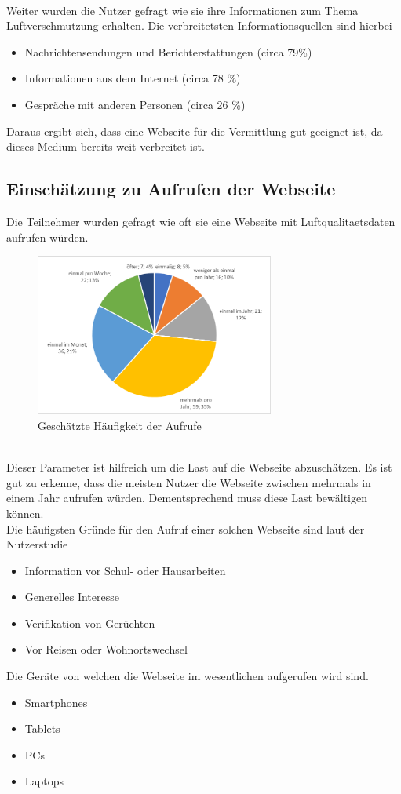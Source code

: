 \\
Weiter wurden die Nutzer gefragt wie sie ihre Informationen zum Thema \gls{Luftverschmutzung} erhalten. Die verbreitetsten Informationsquellen sind hierbei
\begin{itemize} [noitemsep]
    \item Nachrichtensendungen und Berichterstattungen (circa 79\%)
    \item Informationen aus dem Internet (circa 78 \%)
    \item Gespräche mit anderen Personen (circa 26 \%)
\end{itemize}
Daraus ergibt sich, dass eine Webseite für die Vermittlung gut geeignet ist, da dieses Medium bereits weit verbreitet ist.

\subsection{Einschätzung zu Aufrufen der Webseite}
Die Teilnehmer wurden gefragt wie oft sie eine Webseite mit \gls{Luftqualitaetsdaten} aufrufen würden.
\\
\begin{figure}[h]
    \centering
    \includegraphics[width=0.7\textwidth]{media/diagram/aufrufe.png}
    \caption{Geschätzte Häufigkeit der Aufrufe}
\end{figure}
\\
Dieser Parameter ist hilfreich um die Last auf die Webseite abzuschätzen.
Es ist gut zu erkenne, dass die meisten Nutzer die Webseite zwischen mehrmals in einem Jahr aufrufen würden.
Dementsprechend muss \softwarename diese Last bewältigen können.
\\
Die häufigsten Gründe für den Aufruf einer solchen Webseite sind laut der Nutzerstudie
\begin{itemize} [noitemsep]
    \item Information vor Schul- oder Hausarbeiten
    \item Generelles Interesse
    \item Verifikation von Gerüchten
    \item Vor Reisen oder Wohnortswechsel
\end{itemize}
Die Geräte von welchen die Webseite im wesentlichen aufgerufen wird sind.
\begin{itemize} [noitemsep]
    \item Smartphones
    \item Tablets
    \item PCs
    \item Laptops
\end{itemize}


